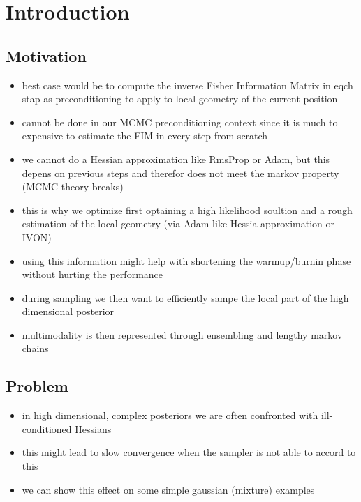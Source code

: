 \chapter{Introduction}\label{chap:introduction}

\section{Motivation}

\begin{itemize}
    \item best case would be to compute the inverse Fisher Information Matrix in eqch stap as preconditioning to apply to local geometry of the current position
    \item cannot be done in our \acrshort{MCMC} preconditioning context since it is much to expensive to estimate the FIM in every step from scratch
    \item we cannot do a Hessian approximation like RmsProp or Adam, but this depens on previous steps and therefor does not meet the markov property (MCMC theory breaks)
    \item this is why we optimize first optaining a high likelihood soultion and a rough estimation of the local geometry (via Adam like Hessia approximation or IVON)
    \item using this information might help with shortening the warmup/burnin phase without hurting the performance
    \item during sampling we then want to efficiently sampe the local part of the high dimensional posterior
    \item multimodality is then represented through ensembling and lengthy markov chains
\end{itemize}


\section{Problem}

\begin{itemize}
    \item in high dimensional, complex posteriors we are often confronted with ill-conditioned Hessians
    \item this might lead to slow convergence when the sampler is not able to accord to this
    \item we can show this effect on some simple gaussian (mixture) examples
\end{itemize}

